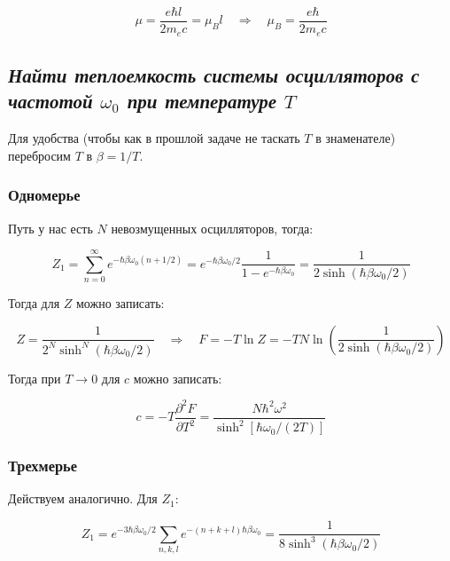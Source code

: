 \documentclass[a4paper, 12pt]{article}
\newcommand{\qrq}
{\ensuremath{\quad \Rightarrow \quad}} %
\begin{document}
\begin{equation}
	\mu = \frac{e \hbar l}{2 m_e c} = \mu_B l \qrq \mu_B = \frac{e \hbar}{2 m_e c}
\end{equation}

\subsection{\textit{Найти теплоемкость системы осцилляторов с частотой $\omega_0$ при температуре $T$}}

Для удобства (чтобы как в прошлой задаче не таскать $T$ в знаменателе) перебросим $T$ в $\beta = 1/T$.

\subsubsection{Одномерье}

Путь у нас есть $N$ невозмущенных осцилляторов, тогда:

\begin{equation}
	Z_1 = \sum\limits_{n=0}^\infty e^{-\hbar \beta \omega_0 (n + 1/2)} = e^{-\hbar \beta \omega_0 / 2} \frac{1}{1 - e^{-\hbar \beta \omega_0}} = \frac{1}{2 \sinh(\hbar \beta \omega_0  /2)}
\end{equation}

Тогда для $Z$ можно записать:

\begin{equation}
	Z = \frac{1}{2^N \sinh^N(\hbar \beta \omega_0 / 2)} \qrq  F  = - T \ln Z = - T N \ln \left(\frac{1}{2\sinh(\hbar \beta \omega_0 / 2)}\right)
\end{equation}

Тогда при $T\rightarrow 0$ для $c$ можно записать:

\begin{equation}
	c = - T \frac{\partial^2 F}{\partial T^2} = \frac{N \hbar^2 \omega^2}{\sinh^2[\hbar \omega_0 / (2 T)]}
\end{equation}

\subsubsection{Трехмерье}

Действуем аналогично. Для $Z_1$:

\begin{equation}
	Z_1 = e^{-3\hbar\beta \omega_0 / 2} \sum\limits_{n, k, l} e^{-(n + k + l) \hbar \beta \omega_0} = \frac{1}{8 \sinh^3(\hbar\beta\omega_0/2)}
\end{equation}
\end{document}
